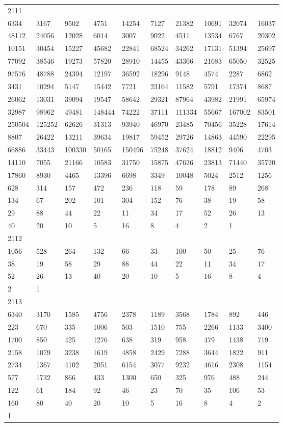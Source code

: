 \begin{longtable}{*{10}{l}}
2111&&&&&&&&&\\
6334& 3167& 9502& 4751& 14254& 7127& 21382& 10691& 32074& 16037\\
48112& 24056& 12028& 6014& 3007& 9022& 4511& 13534& 6767& 20302\\
10151& 30454& 15227& 45682& 22841& 68524& 34262& 17131& 51394& 25697\\
77092& 38546& 19273& 57820& 28910& 14455& 43366& 21683& 65050& 32525\\
97576& 48788& 24394& 12197& 36592& 18296& 9148& 4574& 2287& 6862\\
3431& 10294& 5147& 15442& 7721& 23164& 11582& 5791& 17374& 8687\\
26062& 13031& 39094& 19547& 58642& 29321& 87964& 43982& 21991& 65974\\
32987& 98962& 49481& 148444& 74222& 37111& 111334& 55667& 167002& 83501\\
250504& 125252& 62626& 31313& 93940& 46970& 23485& 70456& 35228& 17614\\
8807& 26422& 13211& 39634& 19817& 59452& 29726& 14863& 44590& 22295\\
66886& 33443& 100330& 50165& 150496& 75248& 37624& 18812& 9406& 4703\\
14110& 7055& 21166& 10583& 31750& 15875& 47626& 23813& 71440& 35720\\
17860& 8930& 4465& 13396& 6698& 3349& 10048& 5024& 2512& 1256\\
628& 314& 157& 472& 236& 118& 59& 178& 89& 268\\
134& 67& 202& 101& 304& 152& 76& 38& 19& 58\\
29& 88& 44& 22& 11& 34& 17& 52& 26& 13\\
40& 20& 10& 5& 16& 8& 4& 2& 1& \\

2112&&&&&&&&&\\
1056& 528& 264& 132& 66& 33& 100& 50& 25& 76\\
38& 19& 58& 29& 88& 44& 22& 11& 34& 17\\
52& 26& 13& 40& 20& 10& 5& 16& 8& 4\\
2& 1& \\

2113&&&&&&&&&\\
6340& 3170& 1585& 4756& 2378& 1189& 3568& 1784& 892& 446\\
223& 670& 335& 1006& 503& 1510& 755& 2266& 1133& 3400\\
1700& 850& 425& 1276& 638& 319& 958& 479& 1438& 719\\
2158& 1079& 3238& 1619& 4858& 2429& 7288& 3644& 1822& 911\\
2734& 1367& 4102& 2051& 6154& 3077& 9232& 4616& 2308& 1154\\
577& 1732& 866& 433& 1300& 650& 325& 976& 488& 244\\
122& 61& 184& 92& 46& 23& 70& 35& 106& 53\\
160& 80& 40& 20& 10& 5& 16& 8& 4& 2\\
1& \\


\end{longtable}
